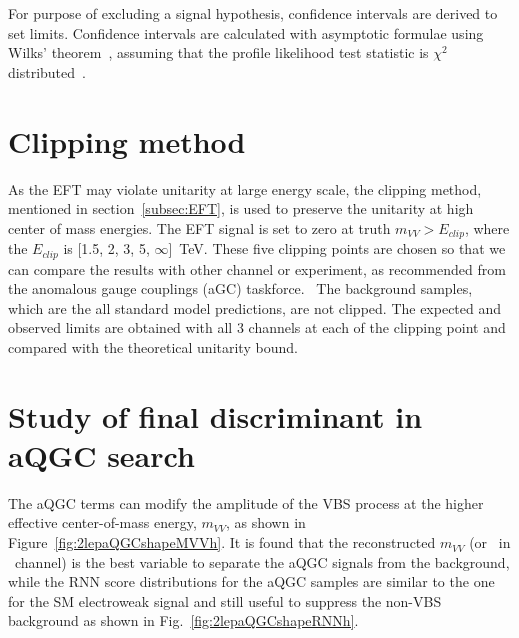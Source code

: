 For purpose of excluding a signal hypothesis, confidence intervals are derived to set limits. 
Confidence intervals are calculated with asymptotic formulae using Wilks' theorem~\cite{10.1214/aoms/1177732360}, assuming that the profile likelihood test statistic is $\chi^2$ distributed~\cite{Cowan:2010js}.

\section{Clipping method}
\label{subsec:clipping}
As the EFT may violate unitarity at large energy scale, the clipping method, mentioned in section~\ref{subsec:EFT}, is used to preserve the unitarity at high center of mass energies. 
The EFT signal is set to zero at truth $m_{VV} > E_{clip}$, where the $E_{clip}$ is [1.5, 2, 3, 5, $\infty$]~TeV. 
These five clipping points are chosen so that we can compare the results with other channel or experiment, as recommended from the anomalous gauge couplings (aGC) taskforce.~\cite{ATL-COM-PHYS-2017-433} 
The background samples, which are the all standard model predictions, are not clipped.
The expected and observed limits are obtained with all 3 channels at each of the clipping point and compared with the theoretical unitarity bound.

\section{Study of final discriminant in aQGC search}
\label{subsec:2binapproach}
The aQGC terms can modify the amplitude of the VBS process at the higher effective center-of-mass energy, $m_{VV}$, as shown in Figure~\ref{fig:2lepaQGCshapeMVVh}.
It is found that the reconstructed $m_{VV}$ (or \mt\ in \zlep\ channel) is the best variable to separate the aQGC signals from the background,
while the RNN score distributions for the aQGC samples are similar to the one for the SM electroweak signal and still useful to suppress the non-VBS background as shown in Fig.~\ref{fig:2lepaQGCshapeRNNh}.


